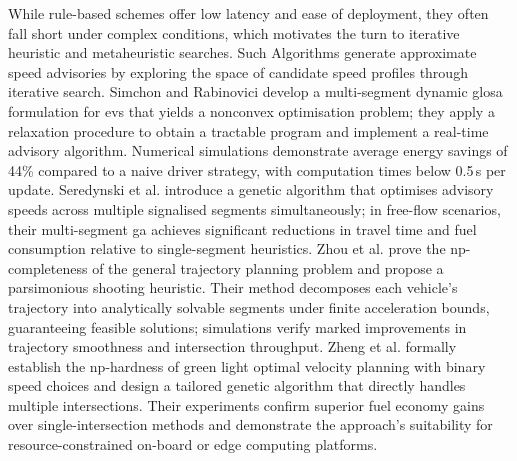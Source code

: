 \mynewline
While rule-based schemes offer low latency and ease of deployment, they often fall short under complex conditions, which motivates the turn to iterative heuristic and metaheuristic searches. Such Algorithms generate approximate speed advisories by exploring the space of candidate speed profiles through iterative search. Simchon and Rabinovici \cite{Simchon2020} develop a multi-segment dynamic \ac{glosa} formulation for \acp{ev} that yields a nonconvex optimisation problem; they apply a relaxation procedure to obtain a tractable program and implement a real-time advisory algorithm. Numerical simulations demonstrate average energy savings of 44\% compared to a naive driver strategy, with computation times below 0.5\,s per update. Seredynski et al. \cite{Seredynski2013} introduce a genetic algorithm that optimises advisory speeds across multiple signalised segments simultaneously; in free-flow scenarios, their multi-segment \ac{ga} achieves significant reductions in travel time and fuel consumption relative to single-segment heuristics. Zhou et al. \cite{Zhou2015} prove the \ac{np}-completeness of the general trajectory planning problem and propose a parsimonious shooting heuristic. Their method decomposes each vehicle’s trajectory into analytically solvable segments under finite acceleration bounds, guaranteeing feasible solutions; simulations verify marked improvements in trajectory smoothness and intersection throughput. Zheng et al. \cite{Zheng2015} formally establish the \ac{np}-hardness of green light optimal velocity planning with binary speed choices and design a tailored genetic algorithm that directly handles multiple intersections. Their experiments confirm superior fuel economy gains over single-intersection methods and demonstrate the approach’s suitability for resource-constrained on-board or edge computing platforms. 
\mynewline
